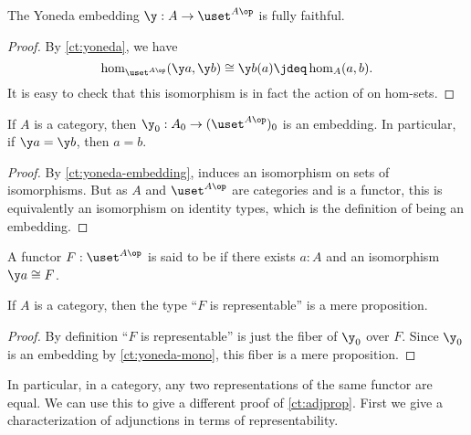 \begin{cor}\label{ct:yoneda-embedding}
  The Yoneda embedding $\y :A\to \uset^{A\op}$ is fully faithful.
\end{cor}
\begin{proof}
  By \cref{ct:yoneda}, we have
  \[ \hom_{\uset^{A\op}}(\y a, \y b) \cong \y b(a) \jdeq \hom_A(a,b). \]
  It is easy to check that this isomorphism is in fact the action of \y on hom-sets.
\end{proof}

\begin{cor}\label{ct:yoneda-mono}
  If $A$ is a category, then $\y_0 : A_0 \to (\uset^{A\op})_0$ is an embedding.
  In particular, if $\y a = \y b$, then $a=b$.
\end{cor}
\begin{proof}
  By \cref{ct:yoneda-embedding}, \y induces an isomorphism on sets of isomorphisms.
  But as $A$ and $\uset^{A\op}$ are categories and \y is a functor, this is equivalently an isomorphism on identity types, which is the definition of being an embedding.
\end{proof}

\begin{defn}\label{ct:representable}
  A functor $F:\uset^{A\op}$ is said to be 
  if there exists $a:A$ and an isomorphism $\y a \cong F$.
\end{defn}

\begin{thm}\label{ct:representable-prop}
  If $A$ is a category, then the type ``$F$ is representable'' is a mere proposition.
\end{thm}
\begin{proof}
  By definition ``$F$ is representable'' is just the fiber of $\y_0$ over $F$.
  Since $\y_0$ is an embedding by \cref{ct:yoneda-mono}, this fiber is a mere proposition.
\end{proof}

In particular, in a category, any two representations of the same functor are equal.
We can use this to give a different proof of \cref{ct:adjprop}.
First we give a characterization of adjunctions in terms of representability.


